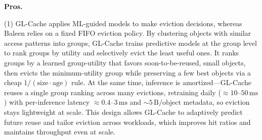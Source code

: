 \noindent\textbf{Pros.}


(1) GL-Cache applies ML-guided models to make eviction decisions, whereas Baleen relies on a fixed FIFO eviction policy. By clustering objects with similar access patterns into groups, GL-Cache trains predictive models at the group level to rank groups by utility and selectively evict the least useful ones. It ranks groups by a learned group-utility that favors soon-to-be-reused, small objects, then evicts the minimum-utility group while preserving a few best objects via a cheap \(1/(\text{size}\cdot\text{age})\) rule. At the same time, inference is amortized—GL-Cache reuses a single group ranking across many evictions, retraining daily (\(\approx 10\)–\(50\,\text{ms}\)) with per-inference latency \(\approx 0.4\)–\(3\,\text{ms}\) and \(\sim 5\,\text{B/object}\) metadata, so eviction stays lightweight at scale. This design allows GL-Cache to adaptively predict future reuse and tailor eviction across workloads, which improves hit ratios and maintains throughput even at scale.

\noindent

